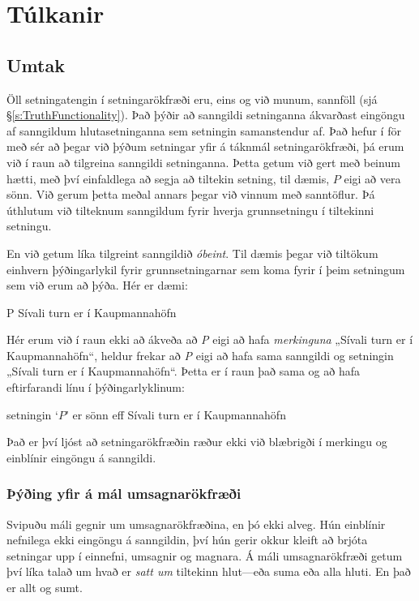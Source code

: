 \part{Túlkanir}
\label{ch.semantics}

\chapter{Umtak}\label{s:Interpretations} %

Öll setningatengin í setningarökfræði eru, eins og við munum, sannföll (sjá \S\ref{s:TruthFunctionality}). Það þýðir að sanngildi setninganna ákvarðast eingöngu af sanngildum hlutasetninganna sem setningin samanstendur af. Það hefur í för með sér að þegar við þýðum setningar yfir á táknmál setningarökfræði, þá erum við í raun að tilgreina sanngildi setninganna. Þetta getum við gert með beinum hætti, með því einfaldlega að segja að tiltekin setning, til dæmis, $P$ eigi að vera sönn. Við gerum þetta meðal annars þegar við vinnum með sanntöflur. Þá úthlutum við tilteknum sanngildum fyrir hverja grunnsetningu í tiltekinni setningu.

En við getum líka tilgreint sanngildið \emph{óbeint}. Til dæmis þegar við tiltökum einhvern þýðingarlykil fyrir grunnsetningarnar sem koma fyrir í þeim setningum sem við erum að þýða. Hér er dæmi:
	\begin{ekey}
		\item[P] Sívali turn er í Kaupmannahöfn
	\end{ekey}
Hér erum við í raun ekki að ákveða að \emph{P} eigi að hafa \emph{merkinguna} „Sívali turn er í Kaupmannahöfn“, heldur frekar að \emph{P} eigi að hafa sama sanngildi og setningin „Sívali turn er í Kaupmannahöfn“. Þetta er í raun það sama og að hafa eftirfarandi línu í þýðingarlyklinum:
	\begin{ebullet}
		\item setningin `$P$' er sönn eff Sívali turn er í Kaupmannahöfn
	\end{ebullet}
Það er því ljóst að setningarökfræðin ræður ekki við blæbrigði í merkingu og einblínir eingöngu á sanngildi.

\section{Þýðing yfir á mál umsagnarökfræði}
Svipuðu máli gegnir um umsagnarökfræðina, en þó ekki alveg. Hún einblínir nefnilega ekki eingöngu á sanngildin, því hún gerir okkur kleift að brjóta setningar upp í einnefni, umsagnir og magnara. Á máli umsagnarökfræði getum því líka talað um hvað er \emph{satt um} tiltekinn hlut---eða suma eða alla hluti. En það er allt og sumt.

